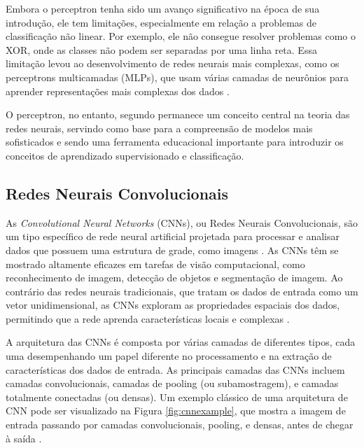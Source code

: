 Embora o perceptron tenha sido um avanço significativo na época de sua introdução, ele tem limitações, especialmente em relação a problemas de classificação não linear. Por exemplo, ele não consegue resolver problemas como o XOR, onde as classes não podem ser separadas por uma linha reta. Essa limitação levou ao desenvolvimento de redes neurais mais complexas, como os perceptrons multicamadas (MLPs), que usam várias camadas de neurônios para aprender representações mais complexas dos dados \cite{bishop2006pattern}. %

O perceptron, no entanto, segundo  permanece um conceito central na teoria das redes neurais, servindo como base para a compreensão de modelos mais sofisticados e sendo uma ferramenta educacional importante para introduzir os conceitos de aprendizado supervisionado e classificação.


\subsection{Redes Neurais Convolucionais}

As \textit{Convolutional Neural Networks} (CNNs), ou Redes Neurais Convolucionais, são um tipo específico de rede neural artificial projetada para processar e analisar dados que possuem uma estrutura de grade, como imagens \cite{o2015introduction}. As CNNs têm se mostrado altamente eficazes em tarefas de visão computacional, como reconhecimento de imagem, detecção de objetos e segmentação de imagem. Ao contrário das redes neurais tradicionais, que tratam os dados de entrada como um vetor unidimensional, as CNNs exploram as propriedades espaciais dos dados, permitindo que a rede aprenda características locais e complexas \cite{nielsen2015neural}.

A arquitetura das CNNs é composta por várias camadas de diferentes tipos, cada uma desempenhando um papel diferente no processamento e na extração de características dos dados de entrada. As principais camadas das CNNs incluem camadas convolucionais, camadas de pooling (ou subamostragem), e camadas totalmente conectadas (ou densas). Um exemplo clássico de uma arquitetura de CNN pode ser visualizado na Figura \ref{fig:cnnexample}, que mostra a imagem de entrada passando por camadas convolucionais, pooling, e densas, antes de chegar à saída \cite{o2015introduction}.

